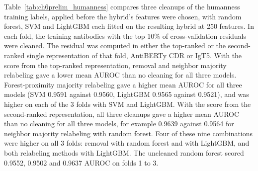 \begin{table}[htbp]
\caption[Down-weighting suspect molecules on the recorded hERG $K_i$ labels]{Held-out RMSE in p$K_i$ (lower is better) on hERG $K_i$ with nothing injected, fold 1 of the 3 scaffold-group folds only; the other two folds did not run. All three models are fitted on MHG-GNN. One row is one setting: the noise score (Table~\ref{tab:noise_estimators}), the number of neighbors $k$ and the strength $\alpha$. These are the 11 settings the run defined; $k = 9$ was run only for the neighbor residual, at $\alpha$ = 1 and 3. A dash marks a score that uses no neighbors. The cross-validation residual uses out-of-fold predictions of a random forest of 100 trees within the training molecules; the two neighbor-based scores find neighbors in the MHG-GNN features. Each training molecule gets the inverse weight of Table~\ref{tab:noise_corrections}, $1/(1 + \alpha\,\tilde s_i)$, where $\tilde s_i$ is its noise score rescaled to run from 0 to 1, so the most suspect molecule weighs one half, one quarter or one tenth of the least suspect at $\alpha$ = 1, 3 or 9. Scored: weights from the noise score. Random: the same weights dealt in random order to the same number of randomly chosen training molecules. Compare these scores only with the unchanged labels in this table, not with Table~\ref{tab:ch6prelim_level0}.}
\label{tab:ch6prelim_level0_suspect}
\end{table}

Table~\ref{tab:ch6prelim_humanness} compares three cleanups of the humanness training labels, applied before the hybrid's features were chosen, with random forest, SVM and LightGBM each fitted on the resulting hybrid at 250 features. In each fold, the training antibodies with the top 10\% of cross-validation residuals were cleaned. The residual was computed in either the top-ranked or the second-ranked single representation of that fold, AntiBERTy CDR or IgT5. With the score from the top-ranked representation, removal and neighbor majority relabeling gave a lower mean AUROC than no cleaning for all three models. Forest-proximity majority relabeling gave a higher mean AUROC for all three models (SVM 0.9591 against 0.9560, LightGBM 0.9565 against 0.9521), and was higher on each of the 3 folds with SVM and LightGBM. With the score from the second-ranked representation, all three cleanups gave a higher mean AUROC than no cleaning for all three models, for example 0.9639 against 0.9564 for neighbor majority relabeling with random forest. Four of these nine combinations were higher on all 3 folds: removal with random forest and with LightGBM, and both relabeling methods with LightGBM. The uncleaned random forest scored 0.9552, 0.9502 and 0.9637 AUROC on folds 1 to 3.

